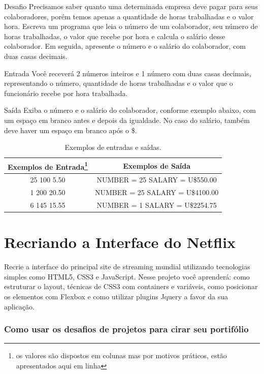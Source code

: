 \documentclass[12pt,a4paper]{article}
\begin{document}
	Desafio
	Precisamos saber quanto uma determinada empresa deve pagar para seus colaboradores, porém temos apenas a quantidade de horas trabalhadas e o valor hora. Escreva um programa que leia o número de um colaborador, seu número de horas trabalhadas, o valor que recebe por hora e calcula o salário desse colaborador. Em seguida, apresente o número e o salário do colaborador, com duas casas decimais.
	
	Entrada
	Você receverá 2 números inteiros e 1 número com duas casas decimais, representando o número, quantidade de horas trabalhadas e o valor que o funcionário recebe por hora trabalhada.
	
	Saída
	Exiba o número e o salário do colaborador, conforme exemplo abaixo, com um espaço em branco antes e depois da igualdade. No caso do salário, também deve haver um espaço em branco após o \$.
	
	\begin{table}[!htpb]
		\centering
		\begin{tabular}{|c|c|}
			\hline
			Exemplos de Entrada\footnote{os valores são dispostos em colunas mas por motivos práticos, estão apresentados aqui em linha} & Exemplos de Saída \\
			\hline
			25 100 5.50 & NUMBER = 25 SALARY = U\$550.00\\
			\hline
			1 200 20.50 & NUMBER = 25 SALARY = U\$4100.00\\
			\hline
			6 145 15.55 & NUMBER = 1 SALARY = U\$2254.75\\
			\hline
		\end{tabular}
		\caption{Exemplos de entradas e saídas.}
		\label{tab:valEntradasSaidasTeste3}
	\end{table}

	\section{Recriando a Interface do Netflix}
	
	Recrie a interface do principal site de streaming mundial utilizando tecnologias simples como HTML5, CSS3 e JavaScript. Nesse projeto você aprenderá: como estruturar o layout, técnicas de CSS3 com containers e variáveis, como posicionar os elementos com Flexbox e como utilizar plugins Jquery a favor da sua aplicação.
	
	\subsubsection{Como usar os desafios de projetos para cirar seu portifólio}
	
\end{document}
